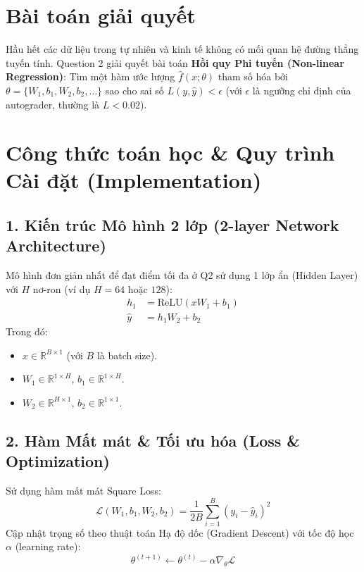 \documentclass[11pt, a4paper]{article}
\begin{document}
\section{Bài toán giải quyết}
Hầu hết các dữ liệu trong tự nhiên và kinh tế không có mối quan hệ đường thẳng tuyến tính. Question 2 giải quyết bài toán \textbf{Hồi quy Phi tuyến (Non-linear Regression)}: Tìm một hàm ước lượng $\hat{f}(x; \theta)$ tham số hóa bởi $\theta = \{W_1, b_1, W_2, b_2, \dots\}$ sao cho sai số $L(y, \hat{y}) < \epsilon$ (với $\epsilon$ là ngưỡng chỉ định của autograder, thường là $L < 0.02$).

\section{Công thức toán học \& Quy trình Cài đặt (Implementation)}

\subsection{1. Kiến trúc Mô hình 2 lớp (2-layer Network Architecture)}
Mô hình đơn giản nhất để đạt điểm tối đa ở Q2 sử dụng 1 lớp ẩn (Hidden Layer) với $H$ nơ-ron (ví dụ $H = 64$ hoặc $128$):
\begin{align}
h_1 &= \text{ReLU}(x W_1 + b_1) \\
\hat{y} &= h_1 W_2 + b_2
\end{align}
Trong đó:
\begin{itemize}[itemsep=2pt]
    \item $x \in \mathbb{R}^{B \times 1}$ (với $B$ là batch size).
    \item $W_1 \in \mathbb{R}^{1 \times H}$, $b_1 \in \mathbb{R}^{1 \times H}$.
    \item $W_2 \in \mathbb{R}^{H \times 1}$, $b_2 \in \mathbb{R}^{1 \times 1}$.
\end{itemize}

\subsection{2. Hàm Mất mát \& Tối ưu hóa (Loss \& Optimization)}
Sử dụng hàm mất mát Square Loss:
\begin{equation}
\mathcal{L}(W_1, b_1, W_2, b_2) = \frac{1}{2 B} \sum_{i=1}^{B} \left( y_i - \hat{y}_i \right)^2
\end{equation}
Cập nhật trọng số theo thuật toán Hạ độ dốc (Gradient Descent) với tốc độ học $\alpha$ (learning rate):
\begin{equation}
\theta^{(t+1)} \leftarrow \theta^{(t)} - \alpha \nabla_{\theta} \mathcal{L}
\end{equation}
\end{document}
